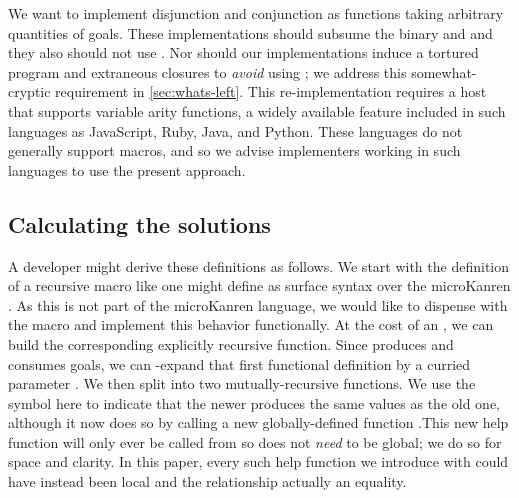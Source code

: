 \documentclass[runningheads,natbib=false]{llncs}
\begin{document}




We want to implement disjunction and conjunction as functions taking
arbitrary quantities of goals. These implementations should subsume
the binary  and  and they also
should not use . Nor should our implementations
induce a tortured program and extraneous closures to \emph{avoid}
using ; we address this somewhat-cryptic requirement
in \cref{sec:whats-left}. This re-implementation requires a host that
supports variable arity functions, a widely available feature included
in such languages as JavaScript, Ruby, Java, and Python. These
languages do not generally support macros, and so we advise
implementers working in such languages to use the present approach.

\subsection{Calculating the solutions}

A developer might derive these definitions as follows. We start with
the definition of a recursive  macro like one might
define as surface syntax over the microKanren . As
this is not part of the microKanren language, we would like to
dispense with the macro and implement this behavior functionally. At
the cost of an , we can build the corresponding
explicitly recursive  function. Since
 produces and consumes goals, we can \texteta{}-expand that
first functional definition by a curried parameter . We
then split  into two mutually-recursive functions. We
use the symbol  here to indicate that the newer
 produces the same values as the old one, although it
now does so by calling a new globally-defined function
.\@ This new help function will only ever be called from
 so does not \emph{need} to be global; we do so for
space and clarity. In this paper, every such help function we
introduce with  could have instead been local and the
relationship actually an equality.
\end{document}
